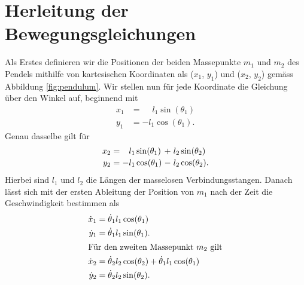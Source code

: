 \section{Herleitung der Bewegungsgleichungen}
%
Als Erstes definieren wir die Positionen der beiden Massepunkte 
\(m_1\) und \(m_2\) des Pendels mithilfe von kartesischen Koordinaten 
als (\(x_1\), \(y_1\)) und (\(x_2\), \(y_2\)) gemäss Abbildung \ref{fig:pendulum}.
Wir stellen nun für jede Koordinate die Gleichung über den Winkel auf,
beginnend mit
\begin{align*}
    x_1 &= \phantom{-}l_1 \sin(\theta_1)\\
    y_1 &= -l_1 \cos(\theta_1).
\end{align*}
Genau dasselbe gilt für
\begin{equation*}
\renewcommand{\arraycolsep}{1.5pt}
\begin{array}{rcrlcrl}
    x_2 &=&  l_1&\hspace*{-1.5pt}\sin(\theta_1)&+&l_2&\hspace*{-1.5pt}\sin(\theta_2)\\[2pt]
    y_2 &=& -l_1&\hspace*{-1.5pt}\cos(\theta_1)&-&l_2&\hspace*{-1.5pt}\cos(\theta_2).  
\end{array}
\end{equation*}
Hierbei sind \(l_1\) und \(l_2\) die Längen der masselosen Verbindungsstangen.
Danach lässt sich mit der ersten Ableitung der Position von
\(m_1\) nach der Zeit die Geschwindigkeit bestimmen als
\begin{align*}
    \dot{x}_1 &= \dot{\theta}_1 l_1 \cos(\theta_1)\\
    \dot{y}_1 &= \dot{\theta}_1 l_1 \sin(\theta_1).\\ 
\intertext{Für den zweiten Massepunkt \(m_2\) gilt}
    \dot{x}_2 &= \dot{\theta}_2 l_2 \cos(\theta_2)
    + \dot{\theta}_1 l_1 \cos(\theta_1)\\
    \dot{y}_2 &= \dot{\theta}_2 l_2 \sin(\theta_2).
\end{align*}

